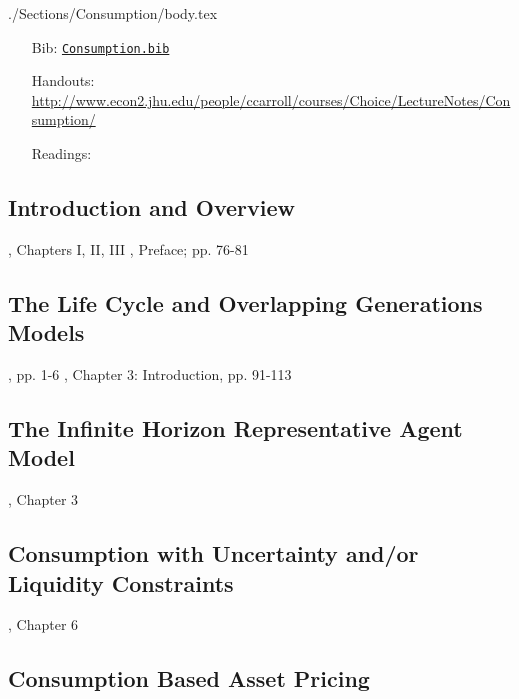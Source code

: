 \documentclass{\econtex}
\begin{document}
\begin{verbatimwrite}{./Sections/Consumption/body.tex}

\begin{itemize}
\item[Bib:] \texttt{\href{http://www.econ2.jhu.edu/people/ccarroll/courses/Choice/Syllabus/Consumption.bib}{Consumption.bib}}
\item[Handouts:] \url{http://www.econ2.jhu.edu/people/ccarroll/courses/Choice/LectureNotes/Consumption/}
\item[Readings:]
\end{itemize}

\newcommand{\IntroC}{Introduction and Overview}
\subsection{\IntroC}\label{subsec:\IntroC}

\newcommand{\dt}{\cite{deatonUnderstandingC}}
\newcommand{\fr}{\cite{friedmanATheory}}
\bi
\reqd \fr, Chapters I, II, III
\reqd \dt, Preface; pp. 76-81
\ei

\subsection{The Life Cycle and Overlapping Generations Models}

\providecommand{\blf}{\cite{blanchard&fischer:text}}
\providecommand{\ro}{\cite{romer:text}}
\bi
\reqd \dt, pp. 1-6
\reqd \blf, Chapter 3: Introduction, pp. 91-113
\recm \cite{diamond:olg}
\recm \cite{feldstein:induced}
\reqd \cite{modigliani:nobel}
\recm \cite{summersCapTax}
\recm \cite{pemberton:failure}
\reqd \cite{carroll&summers:cparallelsy}
\ei

\subsection{The Infinite Horizon Representative Agent Model}

\bi
\reqd \dt, Chapter 3
\reqd \cite{hallRandomWalk}
\recm \cite{flavinSensitive}
\recm \cite{cdSmooth}
\reqd \cite{cmModel}
\recm \cite{hallSubstitution}
\recm \cite{cfwSentiment}
\ei

\subsection{Consumption with Uncertainty and/or Liquidity Constraints}

\bi
\reqd \dt, Chapter 6
\recm \cite{zeldes_jpe89}
\recm \cite{caballero:jme}
\recm \cite{deatonLiqConstr}
\recm \cite{toche:urisk}
\reqd \cite{carroll:atheorynberwp}
\reqd \cite{CarrollKimballPSPW}
\reqd \cite{carroll&summers:cparallelsy}
\recm \cite{BufferStockTheory}
\recm \cite{carroll:death}
\ei

\subsection{Consumption Based Asset Pricing}

\bi
\reqd \cite{lucas:assetpricing}
\reqd \cite{mehra&prescott:puzzle}
\recm \cite{blanchard:burstingbubbles}
\recm \cite{carrollIrrational}
\ei
\end{verbatimwrite}
\end{document}
